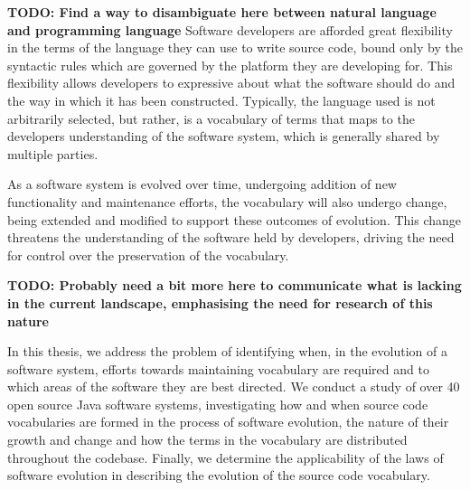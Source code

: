 % 
% 

\textbf{TODO: Find a way to disambiguate here between natural language and programming language}
Software developers are afforded great flexibility in the terms of the language they can use to write source code, bound only by the syntactic rules which are governed by the platform they are developing for. This flexibility allows developers to expressive about what the software should do and the way in which it has been constructed. Typically, the language used is not arbitrarily selected, but rather, is a vocabulary of terms that maps to the developers understanding of the software system, which is generally shared by multiple parties.

As a software system is evolved over time, undergoing addition of new functionality and maintenance efforts, the vocabulary will also undergo change, being extended and modified to support these outcomes of evolution. This change threatens the understanding of the software held by developers, driving the need for control over the preservation of the vocabulary.

\textbf{TODO: Probably need a bit more here to communicate what is lacking in the current landscape, emphasising the need for research of this nature}

In this thesis, we address the problem of identifying when, in the evolution of a software system, efforts towards maintaining vocabulary are required and to which areas of the software they are best directed. We conduct a study of over 40 open source Java software systems, investigating how and when source code vocabularies are formed in the process of software evolution, the nature of their growth and change and how the terms in the vocabulary are distributed throughout the codebase. Finally, we determine the applicability of the laws of software evolution in describing the evolution of the source code vocabulary. 

